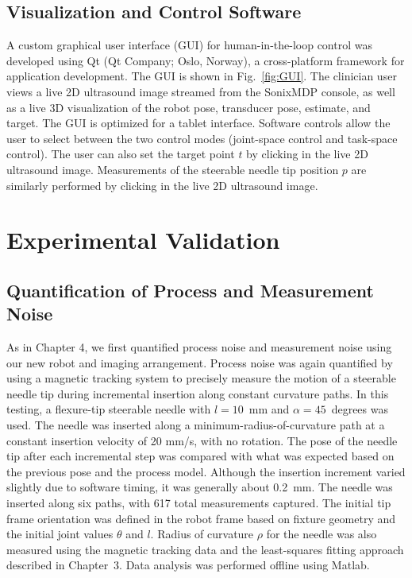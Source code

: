 \subsection{Visualization and Control Software}
A custom graphical user interface (GUI) for human-in-the-loop control was developed using Qt (Qt Company; Oslo, Norway), a cross-platform framework for application development. The GUI is shown in Fig.~\ref{fig:GUI}. The clinician user views a live 2D ultrasound image streamed from the SonixMDP console, as well as a live 3D visualization of the robot pose, transducer pose, estimate, and target. The GUI is optimized for a tablet interface. Software controls allow the user to select between the two control modes (joint-space control and task-space control). The user can also set the target point $t$ by clicking in the live 2D ultrasound image. Measurements of the steerable needle tip position $p$ are similarly performed by clicking in the live 2D ultrasound image. 


\section{Experimental Validation}
\label{sec:HumanInTheLoopValidation}
\subsection{Quantification of Process and Measurement Noise}
As in Chapter 4, we first quantified process noise and measurement noise using our new robot and imaging arrangement. Process noise was again quantified by using a magnetic tracking system to precisely measure the motion of a steerable needle tip during incremental insertion along constant curvature paths. In this testing, a flexure-tip steerable needle with $l = 10$~mm and $\alpha = 45$~degrees was used. The needle was inserted along a minimum-radius-of-curvature path at a constant insertion velocity of 20 mm/s, with no rotation. The pose of the needle tip after each incremental step was compared with what was expected based on the previous pose and the process model. Although the insertion increment varied slightly due to software timing, it was generally about 0.2~mm. The needle was inserted along six paths, with 617 total measurements captured. The initial tip frame orientation was defined in the robot frame based on fixture geometry and the initial joint values $\theta$ and $l$. Radius of curvature $\rho$ for the needle was also measured using the magnetic tracking data and the least-squares fitting approach described in Chapter~3. Data analysis was performed offline using Matlab. 

